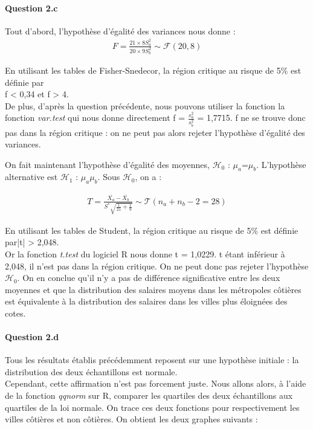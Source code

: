 \documentclass[oneside,a4paper,13pt]{book}
\begin{document}
\paragraph{Question 2.c}
Tout d'abord, l'hypothèse d'égalité des variances nous donne : 
\begin{align*}
    F = \frac{21\times8S_{a}^{2}}{20\times9S_{b}^{2}}\sim \mathcal{F}(20,8)
\end{align*}

En utilisant les tables de Fisher-Snedecor, la région critique au risque de 5\% est définie par\\ f < 0,34 et f > 4. \\
De plus, d'après la question précédente, nous pouvons utiliser la fonction la fonction \textit{var.test} qui nous donne directement f = $\frac{s_{a}^{2}}{s_{b}^{2}}$ = 1,7715. 
f ne se trouve donc pas dans la région critique : on ne peut pas alors rejeter l'hypothèse d'égalité des variances. 

\smallbreak
On fait maintenant l'hypothèse d'égalité des moyennes, $\mathcal{H}_{0}$ : $\mu_{a}$=$\mu_{b}$. L'hypothèse alternative est $\mathcal{H}_{1}$ : $\mu_{a}$\neq$\mu_{b}$. Sous $\mathcal{H}_{0}$, on a : 

\begin{align*}
    T = \frac{\overline{X_{a}}-\overline{X_{b}}}{S^{*}\sqrt{\frac{1}{21}+\frac{1}{9}}} \sim \mathcal{T}(n_{a}+n_{b}-2=28)
\end{align*}

En utilisant les tables de Student, la région critique au risque de 5\% est définie par|t| > 2,048. \\
Or la fonction \textit{t.test} du logiciel R nous donne t = 1,0229. t étant inférieur à 2,048, il n'est pas dans la région critique. On ne peut donc pas rejeter l'hypothèse $\mathcal{H}_{0}$. On en conclue qu'il n'y a pas de différence significative entre les deux moyennes et que la distribution des salaires moyens dans les métropoles côtières est équivalente à la distribution des salaires dans les villes plus éloignées des cotes. 

\paragraph{Question 2.d}
Tous les résultats établis précédemment reposent sur une hypothèse initiale : la distribution des deux échantillons est normale. \\
Cependant, cette affirmation n'est pas forcement juste. Nous allons alors, à l'aide de la fonction \textit{qqnorm} sur R, comparer les quartiles des deux échantillons aux quartiles de la loi normale. On trace ces deux fonctions pour respectivement les villes côtières et non côtières. On obtient les deux graphes suivants : 
\end{document}

